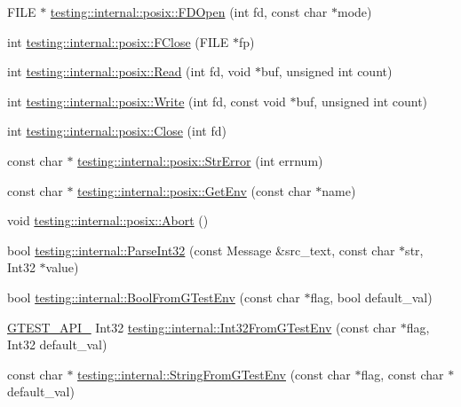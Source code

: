 \begin{DoxyCompactItemize}
F\+I\+L\+E $\ast$ \hyperlink{namespacetesting_1_1internal_1_1posix_af7c268eba32d5a718b36b6b3801302e0}{testing\+::internal\+::posix\+::\+F\+D\+Open} (int fd, const char $\ast$mode)
\item 
int \hyperlink{namespacetesting_1_1internal_1_1posix_af4beeaaa8d62916d5e3b644a1ddfbd6b}{testing\+::internal\+::posix\+::\+F\+Close} (F\+I\+L\+E $\ast$fp)
\item 
int \hyperlink{namespacetesting_1_1internal_1_1posix_a3c6ab13e581a56f1b02f3eb7536c97fd}{testing\+::internal\+::posix\+::\+Read} (int fd, void $\ast$buf, unsigned int count)
\item 
int \hyperlink{namespacetesting_1_1internal_1_1posix_af4acf9f78d55f815a18b43786511abef}{testing\+::internal\+::posix\+::\+Write} (int fd, const void $\ast$buf, unsigned int count)
\item 
int \hyperlink{namespacetesting_1_1internal_1_1posix_a15e5b8f2a535ef1b2529b85b861e4846}{testing\+::internal\+::posix\+::\+Close} (int fd)
\item 
const char $\ast$ \hyperlink{namespacetesting_1_1internal_1_1posix_a4b77b14af6f4d18f83d303b98e9349c4}{testing\+::internal\+::posix\+::\+Str\+Error} (int errnum)
\item 
const char $\ast$ \hyperlink{namespacetesting_1_1internal_1_1posix_a1d5e3da5a27eed25986859fa83cafe95}{testing\+::internal\+::posix\+::\+Get\+Env} (const char $\ast$name)
\item 
void \hyperlink{namespacetesting_1_1internal_1_1posix_a69b8278c59359dd6a6f941b4643db9fb}{testing\+::internal\+::posix\+::\+Abort} ()
\item 
bool \hyperlink{namespacetesting_1_1internal_ac06fc81336a3d80755f4020d34321766}{testing\+::internal\+::\+Parse\+Int32} (const Message \&src\+\_\+text, const char $\ast$str, Int32 $\ast$value)
\item 
bool \hyperlink{namespacetesting_1_1internal_a67132cdce23fb71b6c38ee34ef81eb4c}{testing\+::internal\+::\+Bool\+From\+G\+Test\+Env} (const char $\ast$flag, bool default\+\_\+val)
\item 
\hyperlink{gtest-port_8h_aa73be6f0ba4a7456180a94904ce17790}{G\+T\+E\+S\+T\+\_\+\+A\+P\+I\+\_\+} Int32 \hyperlink{namespacetesting_1_1internal_a0f7e728793f9e6cb0aa2b69eaa468bf3}{testing\+::internal\+::\+Int32\+From\+G\+Test\+Env} (const char $\ast$flag, Int32 default\+\_\+val)
\item 
const char $\ast$ \hyperlink{namespacetesting_1_1internal_a7ed785df46a339403b0f749d3a879201}{testing\+::internal\+::\+String\+From\+G\+Test\+Env} (const char $\ast$flag, const char $\ast$default\+\_\+val)
\end{DoxyCompactItemize}

